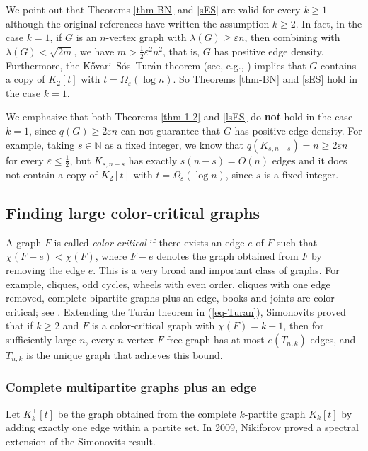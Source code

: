 \documentclass[11pt,a4paper]{article}
\theoremstyle{plain}
\theoremstyle{definition}
\begin{document}
We point out that Theorems \ref{thm-BN} and \ref{sES} are valid for every $k\ge 1$ although the original references have written the assumption $k\ge 2$. 
In fact, in the case $k=1$, if $G$ is an $n$-vertex graph with $\lambda (G)\ge \varepsilon n$, then combining with $\lambda (G) < \sqrt{2m}$, we have $m > \frac{1}{2}\varepsilon^2n^2$, that is, $G$ has positive edge density. Furthermore, the K\H{o}vari--S\'{o}s--Tur\'{a}n theorem (see, e.g., \cite[p. 311]{Bollobas78}) implies that $G$ contains a copy of $K_2[t]$ with $t=\Omega_{\varepsilon}(\log n)$. 
So Theorems \ref{thm-BN} and \ref{sES} hold in the case $k=1$. 


We emphasize that both Theorems \ref{thm-1-2} and \ref{lsES} do {\bf not} hold in the case $k=1$, since $q(G)\ge 2\varepsilon n$ can not guarantee that $G$ has positive edge density.  
For example, taking $s\in \mathbb{N}$ as a fixed integer, we know that $q(K_{s,n-s}) = n \ge 2 \varepsilon n$ for every $\varepsilon \le \frac{1}{2}$, but $K_{s,n-s}$ has exactly $s(n-s)=O(n)$ edges and it does not contain a copy of $K_{2}[t]$ with $t=\Omega_{\varepsilon}(\log n)$, since $s$ is a fixed integer.  


\subsection{Finding large color-critical graphs}

A graph $F$ is called {\it color-critical} if   there exists an edge $e$ of $F$ such that $\chi(F-e)<\chi(F)$, where $F-e$ denotes the graph obtained from $F$ by removing the edge $e$. 
This is a very broad and important class of graphs. 
For example, cliques, odd cycles, wheels with even order, cliques with one edge removed, complete bipartite graphs plus an edge, books and joints are color-critical; see \cite{Mub2010,PY2017,ZL2022jgt, LLZ2025+}. 
Extending the Tur\'{a}n theorem in (\ref{eq-Turan}), 
Simonovits \cite{S1968} proved that 
if $k\ge 2$ and $F$ is a color-critical graph with $\chi(F)=k+1$, then for sufficiently large $n$, every $n$-vertex $F$-free graph has at most 
$e(T_{n,k})$ edges, and $T_{n,k}$ is the unique  graph that achieves this bound. 



\subsubsection{Complete multipartite graphs plus an edge}

 Let $K_{k}^{+}[t]$ be the graph obtained from the complete $k$-partite graph $K_{k}[t]$ by adding exactly one edge within a partite set.  
 In 2009, Nikiforov \cite{N2009} proved a spectral extension of the Simonovits result. 
\end{document}
